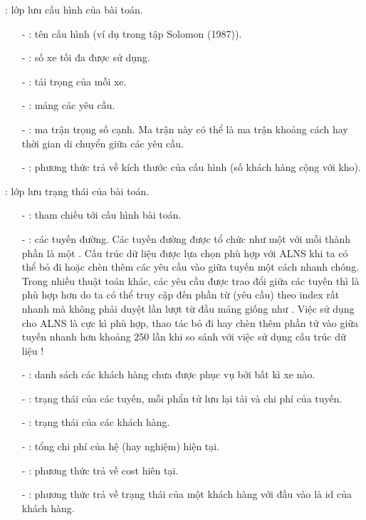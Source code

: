 : lớp lưu cấu hình của bài toán.
\begin{itemize}
	\item[-] : tên cấu hình (ví dụ  trong tập Solomon (1987)).
	\item[-] : số xe tối đa được sử dụng.
	\item[-] : tải trọng của mỗi xe.
	\item[-] : mảng các yêu cầu.
	\item[-] : ma trận trọng số cạnh. Ma trận này có thể là ma trận khoảng cách hay thời gian di chuyển giữa các yêu cầu.
	\item[-] : phương thức trả về kích thước của cấu hình (số khách hàng cộng với kho).
\end{itemize}

: lớp lưu trạng thái của bài toán.
\begin{itemize}
	\item[-] : tham chiếu tới cấu hình bài toán.
	\item[-] : các tuyến đường. Các tuyến đường được tổ chức như một  với mỗi thành phần là một . Cấu trúc dữ liệu  được lựa chọn phù hợp với ALNS khi ta có thể  bỏ đi hoặc chèn thêm các yêu cầu vào giữa tuyến một cách nhanh chóng. Trong nhiều thuật toán khác, các yêu cầu được trao đổi giữa các tuyến thì  là phù hợp hơn do ta có thể truy cập đến phần từ (yêu cầu) theo index rất nhanh mà không phải duyệt lần lượt từ đầu mảng giống như . Việc sử dụng  cho ALNS là cực kì phù hợp, thao tác bỏ đi hay chèn thêm phần tử vào giữa tuyến nhanh hơn khoảng $250$ lần khi so sánh với việc sử dụng cấu trúc dữ liệu !
	\item[-] : danh sách các khách hàng chưa được phục vụ bởi bất kì xe nào.
	\item[-] : trạng thái của các tuyến, mỗi phẩn tử lưu lại tải và chi phí của tuyến.
	\item[-] : trạng thái của các khách hàng.
	\item[-] : tổng chi phí của hệ (hay nghiệm) hiện tại.
	\item[-] : phương thức trả về cost hiên tại.
	\item[-] : phương thức trả về trạng thái của một khách hàng với đầu vào là id của khách hàng.
\end{itemize}